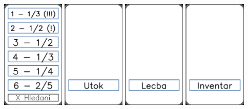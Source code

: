 \documentclass[a4paper]{article}
\begin{document}
	\includegraphics[width=3.0cm]{img-8_11}
	\includegraphics[width=3.0cm]{img-9_0}
	\includegraphics[width=3.0cm]{img-9_1}
	\includegraphics[width=3.0cm]{img-9_2}
\end{document}
